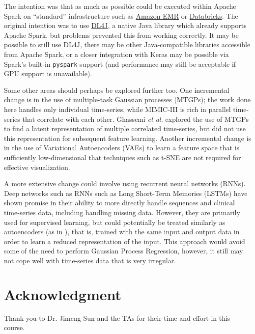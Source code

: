 \documentclass[journal]{IEEEtran}
\begin{document}
The intention was that as much as possible could be executed within
Apache Spark on ``standard'' infrastructure such as
\href{https://aws.amazon.com/emr/}{Amazon EMR} or
\href{https://databricks.com/}{Databricks}.  The original intention
was to use \href{https://deeplearning4j.org/}{DL4J}, a native Java
library which already supports Apache Spark, but problems prevented
this from working correctly.  It may be possible to still use DL4J,
there may be other Java-compatible libraries accessible from Apache
Spark, or a closer integration with Keras may be possible via Spark's
built-in \texttt{pyspark} support (and performance may still be
acceptable if GPU support is unavailable).

Some other areas should perhaps be explored further too.  One
incremental change is in the use of multiple-task Gaussian processes
(MTGPs); the work done here handles only individual time-series, while
MIMIC-III is rich in parallel time-series that correlate with each
other.  Ghassemi \emph{et al.}\cite{Ghassemi2015} explored the use of
MTGPs to find a latent representation of multiple correlated
time-series, but did not use this representation for subsequent
feature learning.  Another incremental change is in the use of
Variational Autoencoders (VAEs) to learn a feature space that is
sufficiently low-dimensional that techniques such as t-SNE are not
required for effective visualization.

A more extensive change could involve using recurrent neural networks
(RNNs).  Deep networks such as RNNs such as Long Short-Term Memories
(LSTMs) have shown promise in their ability to more directly handle
sequences\cite{Sutskever2014} and clinical time-series data, including
handling missing data\cite{Lipton2015, Lipton2015a, Lipton2016}.
However, they are primarily used for supervised learning, but could
potentially be treated similarly as autoencoders (as in
\cite{Klapper-Rybicka2001}), that is, trained with the same input and
output data in order to learn a reduced representation of the input.
This approach would avoid some of the need to perform Gaussian Process
Regression, however, it still may not cope well with time-series data
that is very irregular.

\section*{Acknowledgment}
Thank you to Dr. Jimeng Sun and the TAs for their time and effort in
this course.




\end{document}
